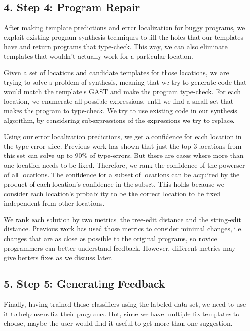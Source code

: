 \subsection{4. Step 4: Program Repair}

After making template predictions and error localization for buggy programs, we exploit existing program synthesis techniques to fill the holes that our templates have and return programs that type-check. This way, we can also eliminate templates that wouldn’t actually work for a particular location.

 Given a set of locations and candidate templates for those locations, we are trying to solve a problem of synthesis, meaning that we try to generate code that would match the template’s GAST and make the program type-check. For each location, we enumerate all possible expressions, until we find a small set that makes the program to type-check. We try to use existing code in our synthesis algorithm, by considering subexpressions of the expressions we try to replace.

 Using our error localization predictions, we get a confidence for each location in the type-error slice. Previous work has shown that just the top 3 locations from this set can solve up to 90\% of type-errors. But there are cases where more than one location needs to be fixed. Therefore, we rank the confidence of the powerser of all locations. The confidence for a subset of locations can be acquired by the product of each location’s confidence in the subset. This holds because we consider each location’s probability to be the correct location to be fixed independent from other locations.

 We rank each solution by two metrics, the tree-edit distance and the string-edit distance. Previous work has used those metrics to consider minimal changes, i.e. changes that are as close as possible to the original programs, so novice programmers can better understand feedback. However, different metrics may give betters fixes as we discuss later.



\subsection{5. Step 5: Generating Feedback}

Finally, having trained those classifiers using the labeled data set, we need to use it to help users fix their programs. But, since we have multiple fix templates to choose, maybe the user would find it useful to get more than one suggestion.

